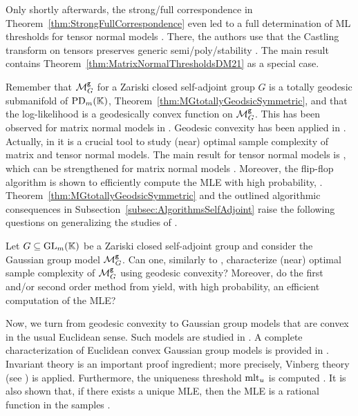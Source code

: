 Only shortly afterwards, the strong/full correspondence in Theorem~\ref{thm:StrongFullCorrespondence} even led to a full determination of ML thresholds for tensor normal models \cite{DMW22TensorNormal}. There, the authors use that the Castling transform on tensors preserves generic semi/poly/stability \cite[Section~3]{DMW22TensorNormal}. The main result \cite[Theorem~1.1]{DMW22TensorNormal} contains Theorem~\ref{thm:MatrixNormalThresholdsDM21} as a special case.

\medskip

Remember that $\mathcal{M}^{\mathtt{g}}_G$ for a Zariski closed self-adjoint group $G$ is a totally geodesic submanifold of $\operatorname{PD}_m(\mathbb K)$, Theorem~\ref{thm:MGtotallyGeodsicSymmetric}, and that the log-likelihood is a geodesically convex function on $\mathcal{M}^{\mathtt{g}}_G$. This has been observed for matrix normal models in \cite{WieselGeodesic}. Geodesic convexity has been applied in \cite{DrtonKurikiHoff, OptimalSampleComplexity}. Actually, in \cite{OptimalSampleComplexity} it is a crucial tool to study (near) optimal sample complexity of matrix and tensor normal models. The main result for tensor normal models is \cite[Theorem~2.4]{OptimalSampleComplexity}, which can be strengthened for matrix normal models \cite[Theorem~2.7]{OptimalSampleComplexity}. Moreover, the flip-flop algorithm is shown to efficiently compute the MLE with high probability, \cite[Theorems~2.9 and~2.10]{OptimalSampleComplexity}. Theorem~\ref{thm:MGtotallyGeodsicSymmetric} and the outlined algorithmic consequences in Subsection~\ref{subsec:AlgorithmsSelfAdjoint} raise the following questions on generalizing the studies of \cite{OptimalSampleComplexity}.

\begin{problem} \label{Prob:OptimalSampleComplexity}
	Let $G \subseteq \operatorname{GL}_m(\mathbb K)$ be a Zariski closed self-adjoint group and consider the Gaussian group model $\mathcal{M}^{\mathtt{g}}_G$. Can one, similarly to \cite{OptimalSampleComplexity}, characterize (near) optimal sample complexity of $\mathcal{M}^{\mathtt{g}}_G$ using geodesic convexity? Moreover, do the first and/or second order method from \cite{GradflowArXiv} yield, with high probability, an efficient computation of the MLE?
\end{problem}


Now, we turn from geodesic convexity to Gaussian group models that are convex in the usual Euclidean sense. Such models are studied in \cite{ishi2021Convex}. A complete characterization of Euclidean convex Gaussian group models is provided in \cite[Proposition~2 and Theorem~2]{ishi2021Convex}. Invariant theory is an important proof ingredient; more precisely, Vinberg theory (see \cite[Section~3.7]{Wallach}) is applied. Furthermore, the uniqueness threshold $\operatorname{mlt}_u$ is computed \cite[Theorem~4]{ishi2021Convex}. It is also shown that, if there exists a unique MLE, then the MLE is a rational function in the samples \cite[Theorem~3]{ishi2021Convex}.
 
